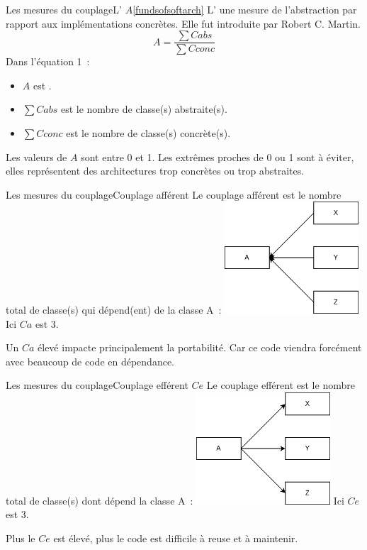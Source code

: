 \documentclass{beamer}
\begin{document}
    \begin{frame}{Les mesures du couplage}{L' $A$\cref{fundsofsoftarch}}
        L'  une mesure de l'abstraction par rapport aux implémentations concrètes.
        Elle fut introduite par Robert C. Martin.
        \begin{equation}
            A = \frac{\sum Cabs}{\sum Cconc}
        \end{equation}
        Dans l'équation 1~:
        \begin{itemize}
            \item $A$ est .
            \item $\sum Cabs$ est le nombre de classe(s) abstraite(s).
            \item $\sum Cconc$ est le nombre de classe(s) concrète(s).
        \end{itemize}
        \bigbreak
        Les valeurs de $A$ sont entre 0 et 1.
        Les extrêmes proches de 0 ou 1 sont à éviter, elles représentent des architectures trop concrètes ou trop abstraites.
    \end{frame}

    \begin{frame}{Les mesures du couplage}{Couplage afférent}
        Le couplage afférent est le nombre total de classe(s) qui dépend(ent) de la classe A~:
        \bigbreak
        \centering
        \includegraphics[width=5cm]{image/afferent-coupling.drawio}
        \bigbreak
        \flushleft
        Ici $Ca$ est 3.

        Un $Ca$ élevé impacte principalement la portabilité.
        Car ce code viendra forcément avec beaucoup de code en dépendance.
    \end{frame}

    \begin{frame}{Les mesures du couplage}{Couplage efférent $Ce$}
        Le couplage efférent est le nombre total de classe(s) dont dépend la classe A~:
        \bigbreak
        \centering
        \includegraphics[width=5cm]{image/efferent-coupling.drawio}
        \bigbreak
        \flushleft
        Ici $Ce$ est 3.

        Plus le $Ce$ est élevé, plus le code est difficile à reuse et à maintenir.
    \end{frame}
\end{document}
